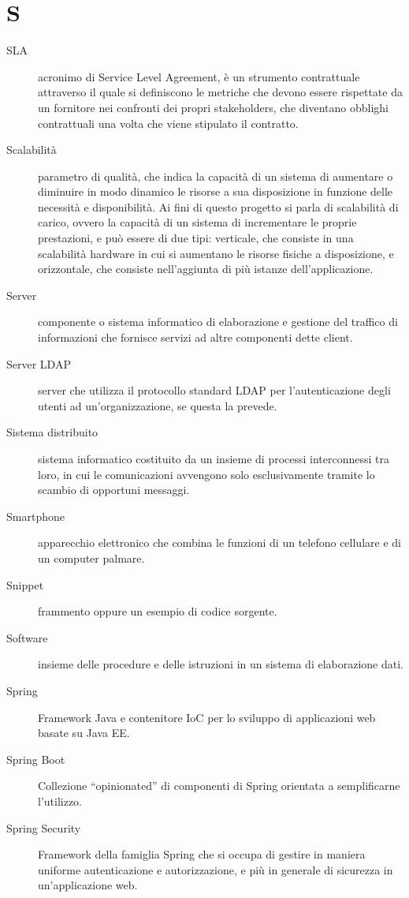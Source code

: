 \documentclass{article}
\begin{document}
\section{S}
\begin{description}
  \item[SLA] acronimo di Service Level Agreement, è un strumento contrattuale attraverso il quale si definiscono le metriche che devono essere rispettate da un fornitore nei confronti dei propri stakeholders, che diventano obblighi contrattuali una volta che viene stipulato il contratto.
  \item[Scalabilità] parametro di qualità, che indica la capacità di un sistema di aumentare o diminuire in modo dinamico le risorse a sua disposizione in funzione delle necessità e disponibilità. Ai fini di questo progetto si parla di scalabilità di carico, ovvero la capacità di un sistema di incrementare le proprie prestazioni, e può essere di due tipi: verticale, che consiste in una scalabilità hardware in cui si aumentano le risorse fisiche a disposizione, e orizzontale, che consiste nell'aggiunta di più istanze dell'applicazione.
  \item[Server] componente o sistema informatico di elaborazione e gestione del traffico di informazioni che fornisce servizi ad altre componenti dette client.
  \item[Server LDAP] server che utilizza il protocollo standard LDAP per l'autenticazione degli utenti ad un'organizzazione, se questa la prevede.
  \item[Sistema distribuito] sistema informatico costituito da un insieme di processi interconnessi tra loro, in cui le comunicazioni avvengono solo esclusivamente tramite lo scambio di opportuni messaggi.
  \item[Smartphone] apparecchio elettronico che combina le funzioni di un telefono cellulare e di un computer palmare.
  \item[Snippet] frammento oppure un esempio di codice sorgente.
  \item[Software] insieme delle procedure e delle istruzioni in un sistema di elaborazione dati.
  \item[Spring] Framework Java e contenitore IoC per lo sviluppo di applicazioni web basate su Java EE\@.
  \item[Spring Boot] Collezione ``opinionated'' di componenti di Spring orientata a semplificarne l'utilizzo.
  \item[Spring Security] Framework della famiglia Spring che si occupa di gestire in maniera uniforme autenticazione e autorizzazione, e più in generale di sicurezza in un'applicazione web.

\end{description}
\end{document}
